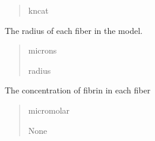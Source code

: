 \documentclass[letterpaper,10pt,english]{sphinxmanual}
\begin{document}
\begin{fulllineitems}
\begin{fulllineitems}
\begin{quote}
\begin{description}
\sphinxAtStartPar
kncat

\end{description}\end{quote}

\end{fulllineitems}


\begin{fulllineitems}
\label{\detokenize{lysis.util:lysis.util.parameters.MicroParameters.fiber_radius}}
\pysigstartsignatures
{}
\pysigstopsignatures
\sphinxAtStartPar
The radius of each fiber in the model.
\begin{quote}\begin{description}
\sphinxAtStartPar
microns

\sphinxAtStartPar
radius

\end{description}\end{quote}

\end{fulllineitems}


\begin{fulllineitems}
\label{\detokenize{lysis.util:lysis.util.parameters.MicroParameters.fibrin_conc_per_fiber}}
\pysigstartsignatures
{}
\pysigstopsignatures
\sphinxAtStartPar
The concentration of fibrin in each fiber
\begin{quote}\begin{description}
\sphinxAtStartPar
micromolar

\sphinxAtStartPar
None

\end{description}\end{quote}


\end{fulllineitems}
\end{fulllineitems}
\end{document}
